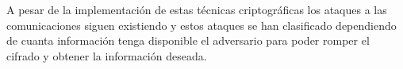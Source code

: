\documentclass[12pt,oneside,onecolumn,openany]{report}
\begin{document}
A  pesar  de  la  implementación  de  estas  técnicas  criptográficas  los  ataques  a  las comunicaciones  siguen  existiendo  y  estos  ataques  se  han  clasificado  dependiendo  de 
cuanta  información  tenga  disponible  el  adversario  para  poder  romper  el  cifrado  y obtener la información deseada. 
\end{document}
